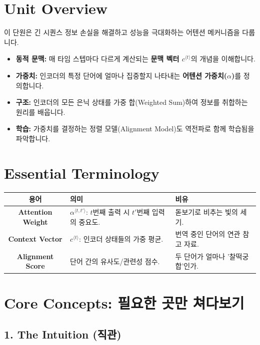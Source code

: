 \documentclass[11pt,a4paper]{book}
\theoremstyle{definition}
\begin{document}
\section{Unit Overview}
\begin{summarybox}[title={핵심 목표}]
이 단원은 긴 시퀀스 정보 손실을 해결하고 성능을 극대화하는 어텐션 메커니즘을 다룹니다.
\begin{itemize}
    \item \textbf{동적 문맥:} 매 타임 스텝마다 다르게 계산되는 \textbf{문맥 벡터 $c^{\langle t \rangle}$}의 개념을 이해합니다.
    \item \textbf{가중치:} 인코더의 특정 단어에 얼마나 집중할지 나타내는 \textbf{어텐션 가중치($\alpha$)}를 정의합니다.
    \item \textbf{구조:} 인코더의 모든 은닉 상태를 가중 합(Weighted Sum)하여 정보를 취합하는 원리를 배웁니다.
    \item \textbf{학습:} 가중치를 결정하는 정렬 모델(Alignment Model)도 역전파로 함께 학습됨을 파악합니다.
\end{itemize}
\end{summarybox}

\section{Essential Terminology}
\begin{center}
\begin{tabular}{|c|l|l|}
\hline
\textbf{용어} & \textbf{의미} & \textbf{비유} \\ \hline
\textbf{Attention Weight} & $\alpha^{\langle t, t' \rangle}$: $t$번째 출력 시 $t'$번째 입력의 중요도. & 돋보기로 비추는 빛의 세기. \\ \hline
\textbf{Context Vector} & $c^{\langle t \rangle}$: 인코더 상태들의 가중 평균. & 번역 중인 단어의 연관 참고 자료. \\ \hline
\textbf{Alignment Score} & 단어 간의 유사도/관련성 점수. & 두 단어가 얼마나 '찰떡궁합'인가. \\ \hline
\end{tabular}
\end{center}

\section{Core Concepts: 필요한 곳만 쳐다보기}

\subsection{1. The Intuition (직관)}
\end{document}

